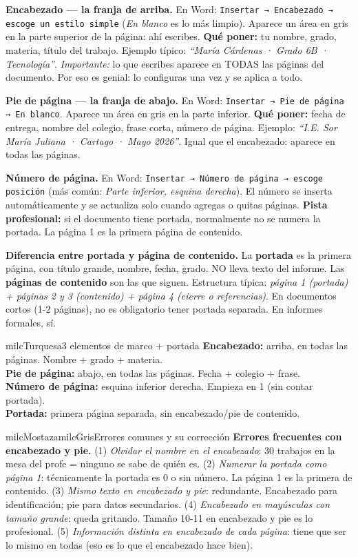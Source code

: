\documentclass[11pt,letterpaper]{article}
\newcommand{\milcpaso}[3]{%
\Needspace{4\baselineskip}%
\begin{tcolorbox}[enhanced,colback=white,colframe=milcLinea,arc=1.5mm,boxrule=.9pt,
  left=14mm,right=4mm,top=3mm,bottom=3mm,before skip=4pt,after skip=4pt,
  fontupper=\RaggedRight,
  overlay={\node[anchor=north west,circle,fill=#2,text=white,inner sep=0pt,
    minimum size=7.4mm,font=\sffamily\bfseries\small]
    at ([xshift=3.6mm,yshift=-3.2mm]frame.north west) {#1};}]
#3
\end{tcolorbox}}
\begin{document}
\milcpaso{1}{milcTurquesa}{\textbf{Encabezado --- la franja de arriba.} En Word: \texttt{Insertar → Encabezado → escoge un estilo simple} (\emph{En blanco} es lo más limpio). Aparece un área en gris en la parte superior de la página: ahí escribes. \textbf{Qué poner:} tu nombre, grado, materia, título del trabajo. Ejemplo típico: \emph{``María Cárdenas · Grado 6B · Tecnología''}. \emph{Importante:} lo que escribes aparece en TODAS las páginas del documento. Por eso es genial: lo configuras una vez y se aplica a todo.}
\milcpaso{2}{milcTurquesa}{\textbf{Pie de página --- la franja de abajo.} En Word: \texttt{Insertar → Pie de página → En blanco}. Aparece un área en gris en la parte inferior. \textbf{Qué poner:} fecha de entrega, nombre del colegio, frase corta, número de página. Ejemplo: \emph{``I.E. Sor María Juliana · Cartago · Mayo 2026''}. Igual que el encabezado: aparece en todas las páginas.}
\milcpaso{3}{milcTurquesa}{\textbf{Número de página.} En Word: \texttt{Insertar → Número de página → escoge posición} (más común: \emph{Parte inferior, esquina derecha}). El número se inserta automáticamente y se actualiza solo cuando agregas o quitas páginas. \textbf{Pista profesional:} si el documento tiene portada, normalmente no se numera la portada. La página 1 es la primera página de contenido.}
\milcpaso{4}{milcTurquesa}{\textbf{Diferencia entre portada y página de contenido.} La \textbf{portada} es la primera página, con título grande, nombre, fecha, grado. NO lleva texto del informe. Las \textbf{páginas de contenido} son las que siguen. Estructura típica: \emph{página 1 (portada) + páginas 2 y 3 (contenido) + página 4 (cierre o referencias)}. En documentos cortos (1-2 páginas), no es obligatorio tener portada separada. En informes formales, sí.}

\begin{drawbox}{milcTurquesa}{3 elementos de marco + portada}
\textbf{Encabezado:} arriba, en todas las páginas. Nombre + grado + materia. \\[1mm]
\textbf{Pie de página:} abajo, en todas las páginas. Fecha + colegio + frase. \\[1mm]
\textbf{Número de página:} esquina inferior derecha. Empieza en 1 (sin contar portada). \\[1mm]
\textbf{Portada:} primera página separada, sin encabezado/pie de contenido.
\end{drawbox}

\begin{softbox}{milcMostaza}{milcGris}{Errores comunes y su corrección}
\textbf{Errores frecuentes con encabezado y pie.} (1) \emph{Olvidar el nombre en el encabezado}: 30 trabajos en la mesa del profe = ninguno se sabe de quién es. (2) \emph{Numerar la portada como página 1}: técnicamente la portada es 0 o sin número. La página 1 es la primera de contenido. (3) \emph{Mismo texto en encabezado y pie}: redundante. Encabezado para identificación; pie para datos secundarios. (4) \emph{Encabezado en mayúsculas con tamaño grande}: queda gritando. Tamaño 10-11 en encabezado y pie es lo profesional. (5) \emph{Información distinta en encabezado de cada página}: tiene que ser lo mismo en todas (eso es lo que el encabezado hace bien).
\end{softbox}
\end{document}
